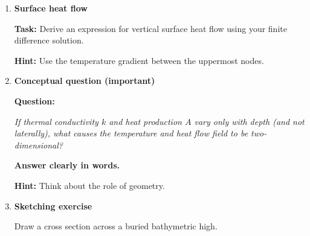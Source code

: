 \documentclass[final,a4paper,12pt]{article}
\begin{document}
\begin{enumerate}
\bigskip

\textbf{Tasks:}

\begin{enumerate}
    \item Thermal conductivity depends on both the sediment matrix and pore fluid.
    Using a harmonic mean, show that:
    \[
    k = \left( \frac{1-\phi}{k_m} + \frac{\phi}{k_w} \right)^{-1}
    \]

    \item Heat production is associated with the solid matrix only. Show that:
    \[
    A = A_0 (1-\phi)
    \]

    \item \textbf{Explain qualitatively:}
    \begin{itemize}
        \item How does conductivity vary with depth?
        \item How does heat production vary with depth?
    \end{itemize}

\end{enumerate}

\bigskip

\item \textbf{Surface heat flow}

\textbf{Task:} Derive an expression for vertical surface heat flow using your
finite difference solution.

\textbf{Hint:} Use the temperature gradient between the uppermost nodes.

\bigskip

\item \textbf{Conceptual question (important)}

\textbf{Question:}

\emph{If thermal conductivity $k$ and heat production $A$ vary only with depth
(and not laterally), what causes the temperature and heat flow field to be
two-dimensional?}

\textbf{Answer clearly in words.}

\medskip

\textbf{Hint:} Think about the role of geometry.

\bigskip

\item \textbf{Sketching exercise}

Draw a cross section across a buried bathymetric high.


\end{enumerate}
\end{document}
